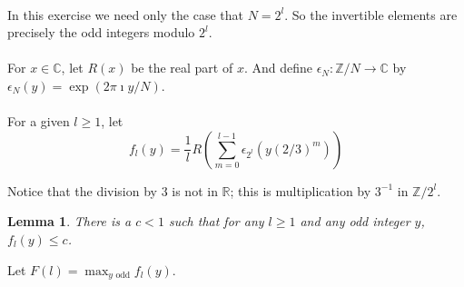 \documentclass{article}
\newcommand{\RR}{\mathbb{R}} %
\newcommand{\ZZ}{\mathbb{Z}} %
\newtheorem{lemma}[theorem]{Lemma}
\begin{document}
\paragraph{}
In this exercise we need only the case that \(N = 2^l\). So the invertible elements are
precisely the odd integers modulo \(2^l\).

\paragraph{}
For \(x \in \mathbb{C}\), let \(R (x)\) be the real part of \(x\). And define
\(\epsilon_N : \ZZ / N \rightarrow \mathbb{C} \) by \(\epsilon_N (y) = \exp{(2\pi \imath y
      / N)}\).

\paragraph{}
For a given \(l \geq 1\), let
\[f_l (y) = \frac{1}{l} R (\sum_{m=0}^{l-1} \epsilon_{2^l}(y {(2/3)}^m ))\]

Notice that the division by 3 is not in \(\RR \); this is multiplication by \(3^{-1}\) in
\(\ZZ /2^l\).

\begin{lemma}
      There is a \(c<1\) such that for any \(l \geq 1\) and any odd integer \(y\), \(f_l
      (y) \leq c\).
\end{lemma}

Let \(F(l) = \max_{y \text{ odd}} f_l (y)\).
\end{document}
